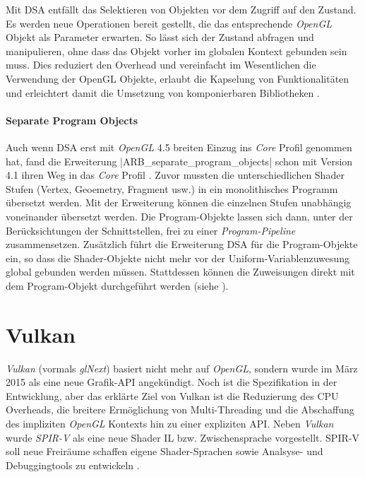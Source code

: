Mit \ac{DSA} entfällt das Selektieren von Objekten vor dem Zugriff auf den Zustand. Es werden neue Operationen bereit gestellt, die das entsprechende \textit{OpenGL} Objekt als Parameter erwarten. So lässt sich der Zustand abfragen und manipulieren, ohne dass das Objekt vorher im globalen Kontext gebunden sein muss. Dies reduziert den Overhead und vereinfacht im Wesentlichen die Verwendung der OpenGL Objekte, erlaubt die Kapselung von Funktionalitäten und erleichtert damit die Umsetzung von komponierbaren Bibliotheken .

\paragraph{Separate Program Objects} Auch wenn \ac{DSA} erst mit \textit{OpenGL} 4.5 breiten Einzug ins \textit{Core} Profil genommen hat, fand die Erweiterung |ARB_separate_program_objects| schon mit Version 4.1 ihren Weg in das \textit{Core} Profil \parencite{Akeley2010}. Zuvor mussten die unterschiedlichen Shader Stufen (Vertex, Geoemetry, Fragment usw.) in ein monolithisches Programm übersetzt werden. Mit der Erweiterung können die einzelnen Stufen unabhängig voneinander übersetzt werden. Die Program-Objekte lassen sich dann, unter der Berücksichtungen der Schnittstellen, frei zu einer \textit{Program-Pipeline} zusammensetzen. Zusätzlich führt die Erweiterung \ac{DSA} für die Program-Objekte ein, so dass die Shader-Objekte nicht mehr vor der Uniform-Variablenzuwesung global gebunden werden müssen. Stattdessen können die Zuweisungen direkt mit dem Program-Objekt durchgeführt werden (siehe ).


\section{Vulkan}\label{sec:vulkan}

\textit{Vulkan} (vormals \textit{glNext}) basiert nicht mehr auf \textit{OpenGL}, sondern wurde im März 2015 als eine neue Grafik-API angekündigt. Noch ist die Spezifikation in der Entwicklung, aber das erklärte Ziel von Vulkan ist die Reduzierung des CPU Overheads, die breitere Ermöglichung von Multi-Threading und die Abschaffung des impliziten \textit{OpenGL} Kontexts hin zu einer expliziten API. Neben \textit{Vulkan} wurde \textit{SPIR-V} als eine neue Shader \ac{IL} bzw. Zwischensprache vorgestellt. SPIR-V soll neue Freiräume schaffen eigene Shader-Sprachen sowie Analsyse- und Debuggingtools zu entwickeln \parencite{Olson2015}.

